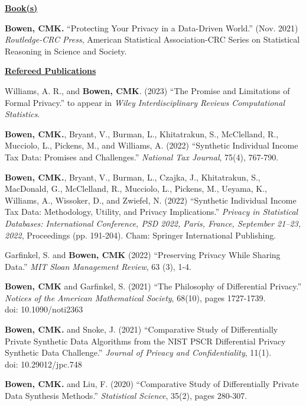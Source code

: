 \noindent\underline{\textbf{Book(s)}}

\begin{etaremune}[topsep=0pt, itemsep=0pt, partopsep=0pt, parsep=0pt]
  \item \textbf{Bowen, CMK.} ``Protecting Your Privacy in a Data-Driven World.'' (Nov. 2021) \textit{Routledge-CRC Press}, American Statistical Association-CRC Series on Statistical Reasoning in Science and Society.
\end{etaremune}

\vspace{6pt}
\noindent\underline{\textbf{Refereed Publications}}
\vspace{4pt}
\begin{etaremune}[topsep=0pt, itemsep=2pt, partopsep=0pt, parsep=0pt]
    \item Williams, A. R., and \textbf{Bowen, CMK}. (2023) ``The Promise and Limitations of Formal Privacy.'' to appear in \textit{Wiley Interdisciplinary Reviews Computational Statistics}.
    
    \item \textbf{Bowen, CMK.}, Bryant, V., Burman, L., Khitatrakun, S., McClelland, R., Mucciolo, L., Pickens, M., and Williams, A. (2022) ``Synthetic Individual Income Tax Data: Promises and Challenges.'' \textit{National Tax Journal}, 75(4), 767-790.
    
    \item \textbf{Bowen, CMK.}, Bryant, V., Burman, L., Czajka, J., Khitatrakun, S., MacDonald, G., McClelland, R., Mucciolo, L., Pickens, M., Ueyama, K., Williams, A., Wissoker, D., and Zwiefel, N. (2022) ``Synthetic Individual Income Tax Data: Methodology, Utility, and Privacy Implications.'' \textit{Privacy in Statistical Databases: International Conference, PSD 2022, Paris, France, September 21–23, 2022}, Proceedings (pp. 191-204). Cham: Springer International Publishing.
    
    \item Garfinkel, S. and \textbf{Bowen, CMK} (2022) ``Preserving Privacy While Sharing Data.'' \textit{MIT Sloan Management Review}, 63 (3), 1-4.
    
    \item \textbf{Bowen, CMK} and Garfinkel, S. (2021) ``The Philosophy of Differential Privacy.'' \textit{Notices of the American Mathematical Society}, 68(10), pages 1727-1739.\\
    doi: 10.1090/noti2363
    
    \item \textbf{Bowen, CMK.} and Snoke, J. (2021) ``Comparative Study of Differentially Private Synthetic Data Algorithms from the NIST PSCR Differential Privacy Synthetic Data Challenge.'' \textit{Journal of Privacy and Confidentiality}, 11(1).\\
    doi: 10.29012/jpc.748

    \item \textbf{Bowen, CMK.} and Liu, F. (2020) ``Comparative Study of Differentially Private Data Synthesis Methods.'' \textit{Statistical Science}, 35(2), pages 280-307.
\end{etaremune}

